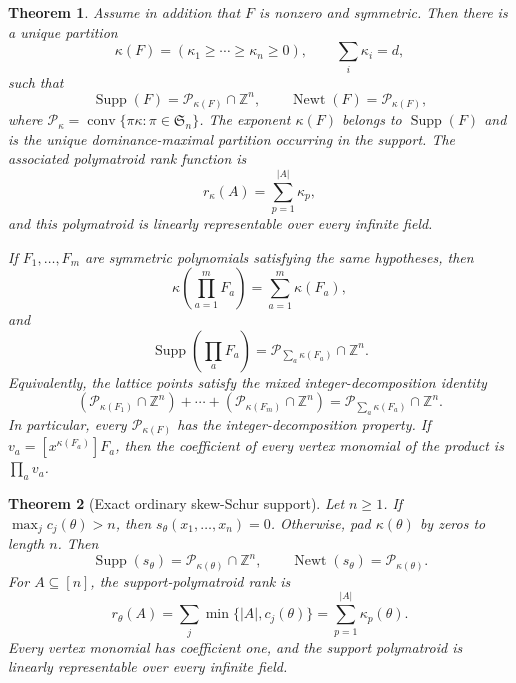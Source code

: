 \documentclass[10pt,a4paper]{amsart}
\newtheorem{theorem}{Theorem}
\DeclareMathOperator{\Newt}{Newt}
\DeclareMathOperator{\Supp}{Supp}
\newcommand{\Z}{\mathbb Z}
\DeclareMathOperator{\conv}{conv}
\begin{document}
\begin{theorem}\label{thm:symmetric-permutahedron}
Assume in addition that $F$ is nonzero and symmetric.  Then there is a unique partition
\[
 \kappa(F)=(\kappa_1\geq\cdots\geq\kappa_n\geq0),
 \qquad \sum_i\kappa_i=d,
\]
such that
\begin{equation}\label{eq:symmetric-support}
 \Supp(F)=\mathcal P_{\kappa(F)}\cap\Z^n,
 \qquad
 \Newt(F)=\mathcal P_{\kappa(F)},
\end{equation}
where $\mathcal P_\kappa=\conv\{\pi\kappa:\pi\in\mathfrak S_n\}$.  The exponent $\kappa(F)$ belongs to $\Supp(F)$ and is the unique dominance-maximal partition occurring in the support.  The associated polymatroid rank function is
\begin{equation}\label{eq:symmetric-rank-function}
 r_\kappa(A)=\sum_{p=1}^{|A|}\kappa_p,
\end{equation}
and this polymatroid is linearly representable over every infinite field.

If $F_1,\ldots,F_m$ are symmetric polynomials satisfying the same hypotheses, then
\begin{equation}\label{eq:product-kappa}
 \kappa\left(\prod_{a=1}^mF_a\right)=\sum_{a=1}^m\kappa(F_a),
\end{equation}
and
\begin{equation}\label{eq:product-support-general}
 \Supp\left(\prod_aF_a\right)
 =\mathcal P_{\sum_a\kappa(F_a)}\cap\Z^n.
\end{equation}
Equivalently, the lattice points satisfy the mixed integer-decomposition identity
\begin{equation}\label{eq:mixed-IDP}
 \left(\mathcal P_{\kappa(F_1)}\cap\Z^n\right)+\cdots+
 \left(\mathcal P_{\kappa(F_m)}\cap\Z^n\right)
 =\mathcal P_{\sum_a\kappa(F_a)}\cap\Z^n.
\end{equation}
In particular, every $\mathcal P_{\kappa(F)}$ has the integer-decomposition
property.  If $v_a=[x^{\kappa(F_a)}]F_a$, then the coefficient of every vertex monomial of the product is $\prod_a v_a$.
\end{theorem}

\begin{theorem}[Exact ordinary skew-Schur support]\label{thm:ordinary-skew-support}
Let $n\geq1$.  If $\max_j c_j(\theta)>n$, then
$s_\theta(x_1,\ldots,x_n)=0$.  Otherwise, pad $\kappa(\theta)$ by zeros to
length $n$.  Then
\begin{equation}\label{eq:ordinary-skew-support}
 \Supp(s_\theta)=\mathcal P_{\kappa(\theta)}\cap\Z^n,
 \qquad
 \Newt(s_\theta)=\mathcal P_{\kappa(\theta)}.
\end{equation}
For $A\subseteq[n]$, the support-polymatroid rank is
\begin{equation}\label{eq:ordinary-skew-rank}
 r_\theta(A)
 =\sum_j\min\{|A|,c_j(\theta)\}
 =\sum_{p=1}^{|A|}\kappa_p(\theta).
\end{equation}
Every vertex monomial has coefficient one, and the support polymatroid is
linearly representable over every infinite field.
\end{theorem}
\end{document}
